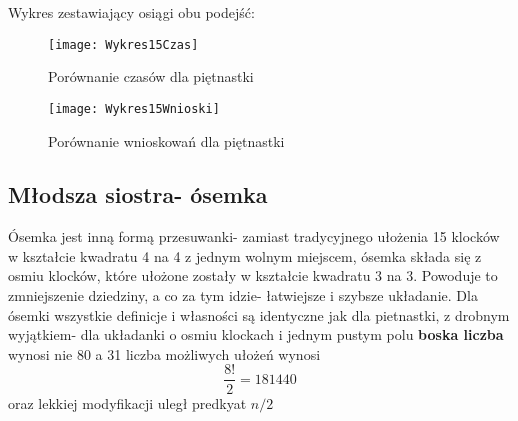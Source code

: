     Wykres zestawiający osiągi obu podejść:

    \begin{figure}[H]
        \texttt{[image: Wykres15Czas]}
        \centering
        \caption{Porównanie czasów dla piętnastki}
        \label{CargoObrazek2}
    \end{figure}
    \begin{figure}[H]
        \texttt{[image: Wykres15Wnioski]}
        \centering
        \caption{Porównanie wnioskowań dla piętnastki}
        \label{CargoObrazek2}
    \end{figure}


    \subsection{Młodsza siostra- ósemka}
        Ósemka jest inną formą przesuwanki- zamiast tradycyjnego ułożenia 15 klocków w kształcie kwadratu 4 na 4 z jednym wolnym miejscem, ósemka 
        składa się z osmiu klocków, które ułożone zostały w kształcie kwadratu 3 na 3. Powoduje to zmniejszenie dziedziny, a co za tym idzie- 
        łatwiejsze i szybsze układanie. Dla ósemki wszystkie definicje i własności są identyczne jak dla pietnastki, z drobnym wyjątkiem- dla 
        układanki o osmiu klockach i jednym pustym polu \textbf{boska liczba} wynosi nie 80 a 31\cite{Eight} liczba możliwych ułożeń wynosi 
        \begin{equation}
            \frac{8!}{2} = 181440
        \end{equation} 
        oraz lekkiej modyfikacji uległ predkyat $n/2$
